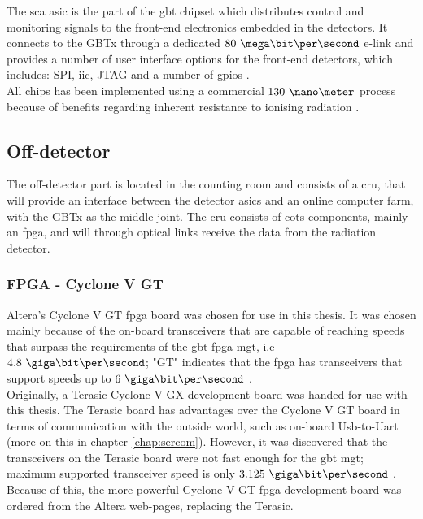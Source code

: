 \documentclass[main.tex]{subfiles}
\begin{document}
The \gls{sca} \gls{asic} is the part of the \gls{gbt} chipset which distributes control and monitoring signals to the front-end electronics embedded in the detectors. It connects to the GBTx through a dedicated $80~\mega\bit\per\second$ e-link and provides a number of user interface options for the front-end detectors, which includes: SPI, \gls{iic}, JTAG and a number of \acrshort{gpio}s \cite{gbtsca15}. \\

\noindent
All chips has been implemented using a commercial $130~\nano\meter$ process because of benefits regarding inherent resistance to ionising radiation \cite{gbtpro10}.

\subsection{Off-detector}
The off-detector part is located in the counting room and consists of a \gls{cru}, that will provide an interface between the detector \acrshort{asic}s and an online computer farm, with the GBTx as the middle joint. The \gls{cru} consists of \gls{cots} components, mainly an \gls{fpga}, and will through optical links receive the data from the radiation detector.

\subsubsection{FPGA - Cyclone V GT} \label{sec:cyclone}

Altera's Cyclone V GT \gls{fpga} board was chosen for use in this thesis. It was chosen mainly because of the on-board transceivers that are capable of reaching speeds that surpass the requirements of the \gls{gbt}-\gls{fpga} \gls{mgt}, i.e $4.8~\giga\bit\per\second$; "GT" indicates that the \gls{fpga} has transceivers that support speeds up to $6~\giga\bit\per\second$ \cite{altera_cvoverview15}.\\
Originally, a Terasic Cyclone V GX development board was handed for use with this thesis. The Terasic board has advantages over the Cyclone V GT board in terms of communication with the outside world, such as on-board Usb-to-Uart (more on this  in chapter \ref{chap:sercom}). However, it was discovered that the transceivers on the Terasic board were not fast enough for the \gls{gbt} \gls{mgt}; maximum supported transceiver speed is only $3.125~\giga\bit\per\second$ \cite{altera_cvoverview15}. Because of this, the more powerful Cyclone V GT \gls{fpga} development board was ordered from the Altera web-pages, replacing the Terasic.
\end{document}
